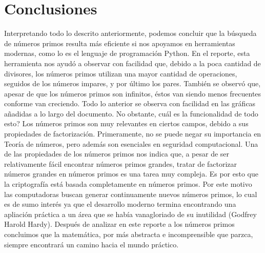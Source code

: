 \section{Conclusiones}
Interpretando todo lo descrito anteriormente, podemos concluir que la b\'usqueda de n\'umeros primos resulta m\'as eficiente si nos apoyamos en herramientas modernas, como lo es el lenguaje de programaci\'on Python. En el reporte, esta herramienta nos ayud\'o a observar con facilidad que, debido a la poca cantidad de divisores, los n\'umeros primos utilizan una mayor cantidad de operaciones, seguidos de los n\'umeros impares, y por \'ultimo los pares. Tambi\'en se observ\'o que, apesar de que los n\'umeros primos son infinitos, \'estos van siendo menos frecuentes conforme van creciendo. Todo lo anterior se observa con facilidad en las gr\'aficas a\~nadidas a lo largo del documento. No obstante, \textquestiondown cu\'al es la funcionalidad de todo esto? Los n\'umeros primos son muy relevantes en ciertos campos, debido a sus propiedades de factorizaci\'on. Primeramente, no se puede negar su importancia en Teor\'ia de n\'umeros, pero adem\'as son esenciales en seguridad computacional. Una de las propiedades de los n\'umeros primos nos indica que, a pesar de ser relativamente f\'acil encontrar n\'umeros primos grandes, tratar de factorizar n\'umeros grandes en n\'umeros primos es una tarea muy compleja. Es por esto que la criptograf\'ia est\'a basada completamente en n\'umeros primos. Por este motivo las computadoras buscan generar continuamente nuevos n\'umeros primos, lo cual es de sumo inter\'es ya que el desarrollo moderno termina encontrando una apliaci\'on pr\'actica a un \'area que se hab\'ia vanagloriado de su inutilidad (Godfrey Harold Hardy). Despu\'es de analizar en este reporte a los n\'umeros primos concluimos que la matem\'atica, por m\'as abstracta e incomprensible que parzca, siempre encontrar\'a un camino hacia el mundo pr\'actico.


